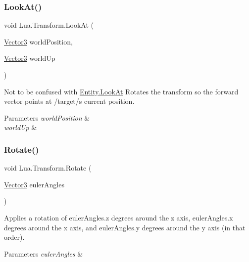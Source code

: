 \subsubsection{\texorpdfstring{LookAt()}{LookAt()}\hspace{0.1cm}{\footnotesize\ttfamily [4/4]}}
{\footnotesize\ttfamily void Lua.\+Transform.\+Look\+At (\begin{DoxyParamCaption}\item[{\mbox{\hyperlink{class_lua_1_1_vector3}{Vector3}}}]{world\+Position,  }\item[{\mbox{\hyperlink{class_lua_1_1_vector3}{Vector3}}}]{world\+Up }\end{DoxyParamCaption})}



Not to be confused with \mbox{\hyperlink{class_lua_1_1_entity_a29cdb052c5422873a708c8080039cb4b}{Entity.\+Look\+At}} Rotates the transform so the forward vector points at /target/\textquotesingle{}s current position. 


\begin{DoxyParams}{Parameters}
{\em world\+Position} & \\
\hline
{\em world\+Up} & \\
\hline
\end{DoxyParams}
\mbox{\label{class_lua_1_1_transform_af5d67d5940a08bc18d105c884e53be84}} 
\subsubsection{\texorpdfstring{Rotate()}{Rotate()}\hspace{0.1cm}{\footnotesize\ttfamily [1/4]}}
{\footnotesize\ttfamily void Lua.\+Transform.\+Rotate (\begin{DoxyParamCaption}\item[{\mbox{\hyperlink{class_lua_1_1_vector3}{Vector3}}}]{euler\+Angles }\end{DoxyParamCaption})}



Applies a rotation of euler\+Angles.\+z degrees around the z axis, euler\+Angles.\+x degrees around the x axis, and euler\+Angles.\+y degrees around the y axis (in that order). 


\begin{DoxyParams}{Parameters}
{\em euler\+Angles} & \\
\hline
\end{DoxyParams}
\mbox{\label{class_lua_1_1_transform_a44f0216f90d0df765efc719bdfbccde2}} 
